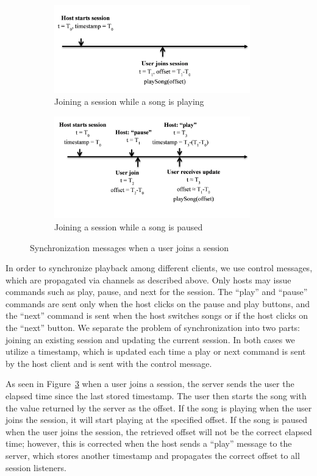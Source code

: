 \begin{figure}[b!]
	\centering
	\begin{subfigure}[b]{0.5\textwidth}
		\centering
		\includegraphics[width=85mm]{joinSessionPlay.png}
		\caption{Joining a session while a song is playing}
		\label{fig:syncJoinPlay}
	\end{subfigure}
	
	\begin{subfigure}[b]{0.5\textwidth}
		\centering
		\includegraphics[width=85mm]{joinSessionPause.png}
		\caption{Joining a session while a song is paused}
		\label{fig:syncJoinPause}
	\end{subfigure}
	\caption{Synchronization messages when a user joins a session}
	\label{fig:syncJoin}
\end{figure}

In order to synchronize playback among different clients, we use 
control messages, which are propagated via channels as described
above. Only hosts may issue commands such as play, pause, and 
next for the session. The ``play'' and ``pause'' commands are sent
only when the host clicks on the pause and play buttons, and the 
``next'' command is sent when the host switches songs or if the
host clicks on the ``next'' button. We separate the problem of synchronization 
into two parts: joining an existing session and updating the
current session. In both cases we utilize a timestamp, which is 
updated each time a play or next command is sent by the host client
and is sent with the control message. 

As seen in Figure~\ref{fig:syncJoin} when a user joins a session, 
the server sends the user the elapsed time since the last stored timestamp. 
The user then starts the song with the value returned by the server as 
the offset. If the song is playing when the user joins the session, 
it will start playing at the specified offset. If the song is paused when 
the user joins the session, the retrieved offset will not be the correct 
elapsed time; however, this is corrected when the host sends a ``play'' 
message to the server, which stores another timestamp and propagates
the correct offset to all session listeners.

